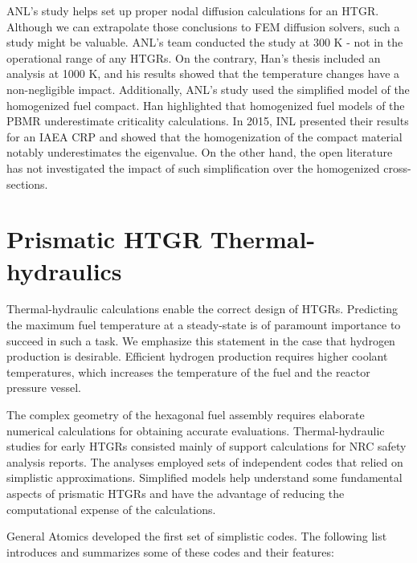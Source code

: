 ANL's study helps set up proper nodal diffusion calculations for an \gls{HTGR}.
Although we can extrapolate those conclusions to \gls{FEM} diffusion solvers, such a study might be valuable.
ANL's team conducted the study at 300 K - not in the operational range of any \glspl{HTGR}.
On the contrary, Han's thesis included an analysis at 1000 K, and his results showed that the temperature changes have a non-negligible impact.
Additionally, ANL's study used the simplified model of the homogenized fuel compact.
Han highlighted that homogenized fuel models of the \gls{PBMR} underestimate criticality calculations.
In 2015, \gls{INL} presented their results \cite{strydom_results_2015} for an \gls{IAEA} \gls{CRP} \cite{tyobeka_htgr_2011} and showed that the homogenization of the compact material notably underestimates the eigenvalue.
On the other hand, the open literature has not investigated the impact of such simplification over the homogenized cross-sections.

\section{Prismatic HTGR Thermal-hydraulics}

Thermal-hydraulic calculations enable the correct design of \glspl{HTGR}.
Predicting the maximum fuel temperature at a steady-state is of paramount importance to succeed in such a task.
We emphasize this statement in the case that hydrogen production is desirable.
Efficient hydrogen production requires higher coolant temperatures, which increases the temperature of the fuel and the reactor pressure vessel.

The complex geometry of the hexagonal fuel assembly requires elaborate numerical calculations for obtaining accurate evaluations.
Thermal-hydraulic studies for early \glspl{HTGR} consisted mainly of support calculations for \gls{NRC} safety analysis reports.
The analyses employed sets of independent codes that relied on simplistic approximations.
Simplified models help understand some fundamental aspects of prismatic \glspl{HTGR} and have the advantage of reducing the computational expense of the calculations.

General Atomics \cite{shenoy_htgr_1974} developed the first set of simplistic codes.
The following list introduces and summarizes some of these codes and their features:

